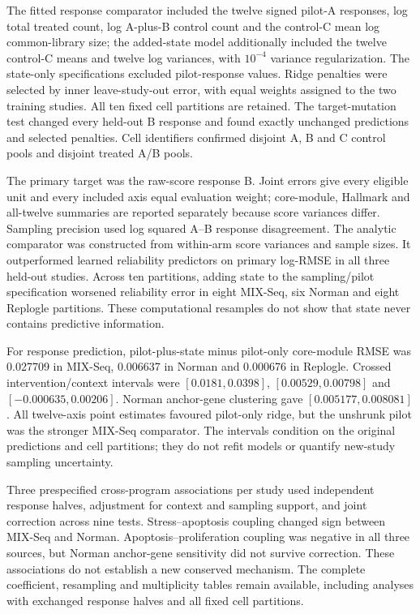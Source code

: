 \documentclass[a4paper,fleqn]{cas-sc}
\makeatletter
\DeclareRobustCommand{\rev}[1]{{\color{red}\def\@citecolor{black}\def\@linkcolor{red}\def\@urlcolor{red}#1}}
\makeatother
\begin{document}
\rev{The fitted response comparator included the twelve signed pilot-A responses, log total treated count, log A-plus-B control count and the control-C mean log common-library size; the added-state model additionally included the twelve control-C means and twelve log variances, with $10^{-4}$ variance regularization.} \rev{The state-only specifications excluded pilot-response values.} \rev{Ridge penalties were selected by inner leave-study-out error, with equal weights assigned to the two training studies.} \rev{All ten fixed cell partitions are retained.} \rev{The target-mutation test changed every held-out B response and found exactly unchanged predictions and selected penalties.} \rev{Cell identifiers confirmed disjoint A, B and C control pools and disjoint treated A/B pools.}

\rev{The primary target was the raw-score response B.} \rev{Joint errors give every eligible unit and every included axis equal evaluation weight; core-module, Hallmark and all-twelve summaries are reported separately because score variances differ.} \rev{Sampling precision used log squared A--B response disagreement.} \rev{The analytic comparator was constructed from within-arm score variances and sample sizes.} \rev{It outperformed learned reliability predictors on primary log-RMSE in all three held-out studies.} \rev{Across ten partitions, adding state to the sampling/pilot specification worsened reliability error in eight MIX-Seq, six Norman and eight Replogle partitions.} \rev{These computational resamples do not show that state never contains predictive information.}

\rev{For response prediction, pilot-plus-state minus pilot-only core-module RMSE was 0.027709 in MIX-Seq, 0.006637 in Norman and 0.000676 in Replogle.} \rev{Crossed intervention/context intervals were $[0.0181,0.0398]$, $[0.00529,0.00798]$ and $[-0.000635,0.00206]$.} \rev{Norman anchor-gene clustering gave $[0.005177,0.008081]$.} \rev{All twelve-axis point estimates favoured pilot-only ridge, but the unshrunk pilot was the stronger MIX-Seq comparator.} \rev{The intervals condition on the original predictions and cell partitions; they do not refit models or quantify new-study sampling uncertainty.}

\rev{Three prespecified cross-program associations per study used independent response halves, adjustment for context and sampling support, and joint correction across nine tests.} \rev{Stress--apoptosis coupling changed sign between MIX-Seq and Norman.} \rev{Apoptosis--proliferation coupling was negative in all three sources, but Norman anchor-gene sensitivity did not survive correction.} \rev{These associations do not establish a new conserved mechanism.} \rev{The complete coefficient, resampling and multiplicity tables remain available, including analyses with exchanged response halves and all fixed cell partitions.}
\end{document}
